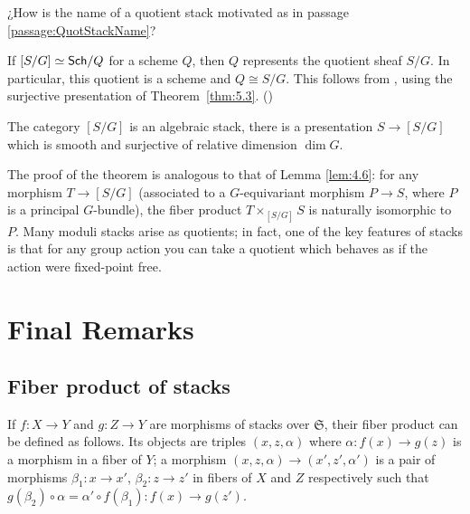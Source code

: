 \documentclass[12pt]{memoir}
\newcounter{passage}
\begin{document}
\begin{ptcb}
    \begin{Qn}
        ¿How is the name of a quotient stack motivated as in passage \ref{passage:QuotStackName}?
    \end{Qn}
    \tcbline 
    If \([S/G]\simeq\mathsf{Sch}/Q\) for a scheme \(Q\), then \(Q\)
    represents the quotient sheaf \(S/G\). In particular, this quotient
    is a scheme and \(Q\cong S/G\). This follows from
    \cite[Lemmas~78.19.4 and~78.22.2]{notes:stacks-quotient-scheme},
    using the surjective presentation of Theorem~\ref{thm:5.3}. ()
\end{ptcb}
\begin{Th}\label{thm:5.3}
The category $[S/G]$ is an algebraic stack, there is a presentation $S \to [S/G]$ which is smooth and surjective of relative dimension $\dim G$.
\end{Th}

The proof of the theorem is analogous to that of Lemma \ref{lem:4.6}: for any morphism $T \to [S/G]$ (associated to a $G$-equivariant morphism $P \to S$, where $P$ is a principal $G$-bundle), the fiber product $T \times_{[S/G]} S$ is naturally isomorphic to $P$. Many moduli stacks arise as quotients; in fact, one of the key features of stacks is that for any group action you can take a quotient which behaves as if the action were fixed-point free.

\section{Final Remarks}

\subsection{Fiber product of stacks}

\begin{Def}\label{def:6.1}
If $f\colon X \to Y$ and $g\colon Z \to Y$ are morphisms of stacks over $\mathfrak{S}$, their fiber product can be defined as follows. Its objects are triples $(x, z, \alpha)$ where $\alpha\colon f(x) \to g(z)$ is a morphism in a fiber of $Y$; a morphism $(x, z, \alpha) \to (x', z', \alpha')$ is a pair of morphisms $\beta_1\colon x \to x'$, $\beta_2\colon z \to z'$ in fibers of $X$ and $Z$ respectively such that $g(\beta_2) \circ \alpha = \alpha' \circ f(\beta_1)\colon f(x) \to g(z')$.
\end{Def}

\end{document}

